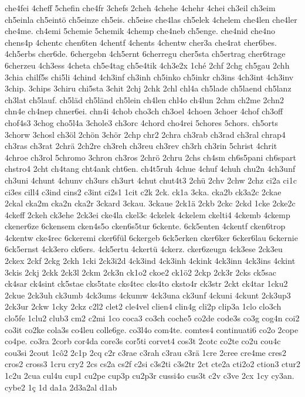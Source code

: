 {che4fei
4cheff
5chefin
che4fr
3chefs
2cheh
4chehe
4chehr
4chei
ch3eil
ch3eim
ch5einla
ch5eintö
ch5einze
ch5eis.
ch5eise
che4las
ch5elek
4chelem
che4len
che4ler
che4me.
ch4emi
5chemie
5chemik
4chemp
che4neb
ch5enge.
che4nid
che4no
chens4p
4chentc
chen6ten
4chentf
4chents
4chentw
cher3a
che4rat
cher6bes.
4ch5erbs
cher6de.
6chergebn
4ch5ernt
6cherregu
cher5sta
ch5ertrag
cher6trage
6cherzeu
4ch3ess
4cheta
ch5e4tag
ch5e4tik
4ch3e2x
1ché
2chf
2chg
ch5gau
2chh
3chia
chilf5s
chi5li
4chind
4ch3inf
ch3inh
ch5inko
ch5inkr
ch3ins
4ch3int
4ch3inv
3chip.
3chips
3chiru
chi5sta
3chit
2chj
2chk
2chl
chl4a
ch5lade
ch5laend
ch5lanz
ch3lat
ch5lauf.
ch5läd
ch5länd
ch5lein
ch4len
chl4o
ch4lun
2chm
ch2me
2chn2
chn4e
ch4nep
chner6ei.
chn4i
4chob
cho3ch
ch3oel
4choen
3choer
4chof
ch3off
chof4s3
3chog
cho5l4a
3chole3
ch3orc
4chord
cho4rei
5chores
5chors.
ch5orts
3chorw
3chosl
ch3öl
2chön
3chör
2chp
chr2
2chra
ch3rab
ch3rad
ch3ral
chrap4
ch3ras
ch3rat
2chrä
2ch2re
ch3reh
ch3reu
ch3rev
ch3rh
ch3rin
5christ
4chrit
4chroe
ch3rol
5chromo
3chron
ch3ros
2chrö
2chru
2chs
ch4sm
ch6s5pani
ch6spart
chstro4
2cht
ch4tang
cht4ank
cht6en.
ch4t5ruh
4chue
4chuf
4chuh
chu2n
4ch3unf
ch3uni
4chunt
4chunv
ch3urs
ch3urt
4chut
chut4t3
2chü
2chv
2chw
2chz
ci2a
ci1c
ci3es
cill4
c3ind
cins2
c3int
ci2s1
1cit
c2k
2ck.
ck1a
3cka.
cka2b
ck3a2c
2ckae
2ckal
cka2m
cka2n
cka2r
3ckard
3ckau.
3ckaue
2ck1ä
2ckb
2ckc
2ckd
1cke
2cke2c
4ckeff
2ckeh
ck3ehe
2ck3ei
cke4la
ckel3c
4ckelek
4ckelem
ckelti4
4ckemb
4ckemp
ckener6ze
6ckensem
cken4s5o
cken6s5tur
6ckente.
6ck5enten
4ckentf
cken6trop
4ckentw
cke4rec
6ckeremi
cker6fül
6ckergeb
6ck5erken
cker6ker
6cker6lau
6ckernie
6ck5ernst
4ck3ero
ck6ers.
4ck5ertu
4ckertü
4ckerz.
cker6zeugn
4ck3ese
2ck3eu
2ckex
2ckf
2ckg
2ckh
1cki
2ck3i2d
4ck3ind
4ck3inh
4ckink
4ck3inn
4ck3ins
4ckint
3ckis
2ckj
2ckk
2ck3l
2ckm
2ck3n
ck1o2
ckoe2
ck1ö2
2ckp
2ck3r
2cks
ck5sac
ck4sar
ck4sint
ck5stae
cks5tate
cks4tec
cks4to
cksto4r
ck3str
2ckt
ck4tar
1cku2
2ckue
2ck3uh
ck3umb
4ck3ums
4ckumw
4ck3una
ck3unf
4ckuni
4ckunt
2ck3up3
2ck3ur
2ckw
1cky
2ckz
c2l2
clet2
cle4vel
clien4
clin4g
cli2p
clip3a
1clo
clo3ch
clo5fe
1clu2
club3
cm2
c2mi
1co
coca3
co3ch
coche5
co2de
code3s
co3g
cog4n
coi2
co3it
co2ke
cola3s
co4leu
colle6ge.
co3l4o
com4te.
comtes4
continuati6
co2o
2cope
co4pe.
co3ra
2corb
cor4da
core3s
cor5ti
corvet4
cos3t
2cotc
co2te
co2u
cou4c
cou3si
2cout
1cô2
2c1p
2cq
c2r
c3rae
c3rah
c3rau
c3rä
1cre
2cree
cre4me
cres2
cros2
cross3
1cru
cry2
2cs
cs2a
cs2f
c2si
c3s2ti
c3s2tr
2ct
cte2a
cti2o2
ction3
ctur2
1c2u
2cua
cul4u
cup1
cu2pe
cup3p
cu2p3r
cussi4o
cus3t
c2v
c3ve
2cx
1cy
cy3an.
cybe2
1ç
1d
da1a
2d3a2al
d1ab
}
